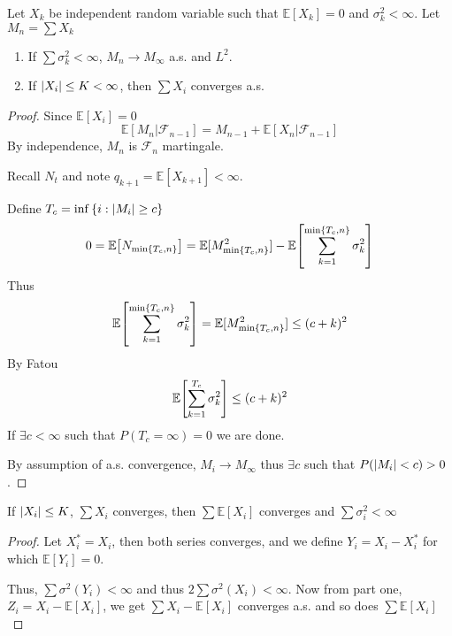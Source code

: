 \begin{theorem}
	Let $X_k$ be independent random variable such that $\mathbb{E} [X_k] = 0$ and $\sigma^2_k < \infty$. Let $M_n = \sum X_k$
	\begin{enumerate}
		\item If $\sum \sigma_k^2 <\infty $, $M_n\to M_\infty$ a.s. and $L^2$.
		\item If $\abs{X_i} \leq K < \infty $, then $\sum X_i $ converges a.s.
	\end{enumerate} 

\begin{proof}
	Since $\mathbb{E} [X_i] = 0$
	$$\mathbb{E} [M_n|\mathcal{F}_{n-1}] = M_{n-1} + \mathbb{E}[X_n | \mathcal{F}_{n-1}]$$
	By independence, $M_n$ is $\mathcal{F}_n$ martingale.
	
	
	Recall $N_t$ and note $q_{k+1} = \mathbb{E} [X_{k+1}] <\infty$.
	
	Define
	$T_c = \inf \left\{  i: \abs{M_i} \geq c \right\}$
	$$0=\mathbb{E} \qty[N_{\min \left\{ T_c, n \right\}}] = \mathbb{E} [M^2_{\min \left\{ T_c, n \right\}}] - \mathbb{E} \qty[\sum_{k=1}^{\min \left\{ T_c, n \right\}} \sigma_k^2] $$
	Thus
	$$\mathbb{E} \qty[\sum_{k=1}^{\min \left\{ T_c, n \right\}} \sigma_k^2] = \mathbb{E} [M^2_{\min \left\{ T_c, n \right\}}] \leq (c+k)^2 $$
	By Fatou
	$$\mathbb{E} \qty[\sum_{k=1}^{T_c} \sigma_k^2]\leq (c+k)^2 $$
	If $\exists c<\infty$ such that $P(T_c=\infty) = 0$ we are done.
	
	By assumption of a.s. convergence, $M_i \to  M_\infty $ thus $\exists c $ such that $P(\abs{M_i} <c) > 0$.
\end{proof}

\end{theorem}


\begin{lemma}
	If $\abs{X_i} \leq K$, $\sum X_i $ converges, then $\sum \mathbb{E} [X_i]$ converges and $\sum \sigma_i^2<\infty$
	\begin{proof}
		Let $X^*_i=X_i$, then both series converges, and we define $Y_i = X_i - X_i^*$ for which $\mathbb{E} [Y_i] = 0$.
		
		Thus, $\sum \sigma^2(Y_i) <\infty$ and thus $2\sum \sigma^2(X_i) <\infty$. Now from part one, $Z_i = X_i -\mathbb{E} [X_i]$, we get
		$\sum X_i -\mathbb{E} [X_i] $ converges a.s. and so does $\sum \mathbb{E} [X_i]$
	\end{proof}
\end{lemma}



